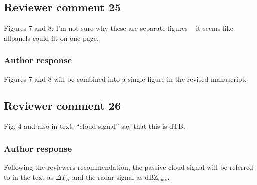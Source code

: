 \documentclass[11pt]{scrartcl}
\begin{document}
\subsection*{Reviewer comment 25}
Figures 7 and 8:  I’m not sure why these are separate figures – it seems like allpanels could fit on one page.

\subsubsection*{Author response}

Figures 7 and 8 will be combined into a single figure in the revised manuscript.

\subsection*{Reviewer comment 26}
Fig. 4 and also in text: “cloud signal” say that this is dTB.

\subsubsection*{Author response}

Following the reviewers recommendation, the passive cloud signal will be
referred to in the text as $\Delta T_B$ and the radar signal as
$\text{dBZ}_\text{max}$.

%
%
%
%
\end{document}
